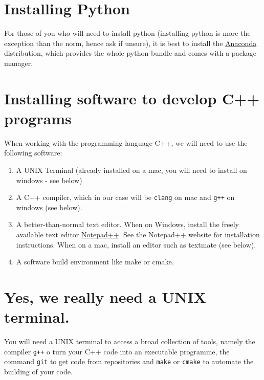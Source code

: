 \documentclass[
]{book}
\providecommand{\tightlist}{%
  \setlength{\itemsep}{0pt}\setlength{\parskip}{0pt}}
\begin{document}
\hypertarget{installing-python}{%
\section{Installing Python}\label{installing-python}}

For those of you who will need to install python (installing python is more the exception than the norm, hence ask if unsure), it is best to install the \href{https://www.anaconda.com/products/individual}{Anaconda} distribution, which provides the whole python bundle and comes with a package manager.

\hypertarget{section:installcpp}{%
\section{Installing software to develop C++ programs}\label{section:installcpp}}

When working with the programming language C++, we will need to use the following software:

\begin{enumerate}
\def\labelenumi{\arabic{enumi}.}
\tightlist
\item
  A UNIX Terminal (already installed on a mac, you will need to install on windows - see below)
\item
  A C++ compiler, which in our case will be \texttt{clang} on mac and \texttt{g++} on windows (see below).
\item
  A better-than-normal text editor. When on Windows, install the freely available text editor \href{}{Notepad++}. See the Notepad++ website for installation instructions. When on a mac, install an editor such as textmate (see below).
\item
  A software build environment like make or cmake.
\end{enumerate}

\hypertarget{yes-we-really-need-a-unix-terminal.}{%
\section{Yes, we really need a UNIX terminal.}\label{yes-we-really-need-a-unix-terminal.}}

You will need a UNIX terminal to access a broad collection of tools, namely the compiler \texttt{g++} o turn your C++ code into an executable programme, the command \texttt{git} to get code from repositories and \texttt{make} or \texttt{cmake} to automate the building of your code.
\end{document}
